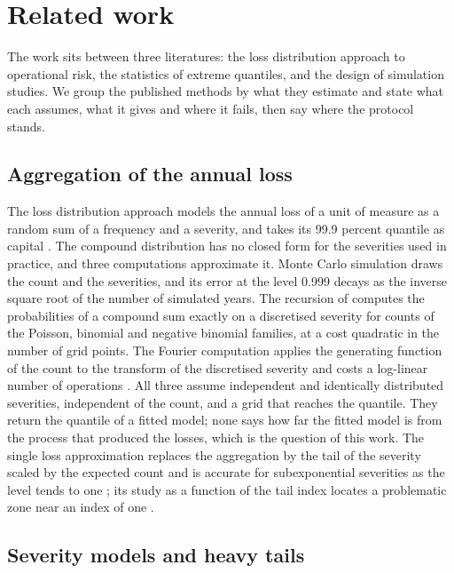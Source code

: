 \section{Related work}
\label{sec:related-work}

The work sits between three literatures: the loss distribution approach to operational risk, the statistics of extreme quantiles, and the design of simulation studies.
We group the published methods by what they estimate and state what each assumes, what it gives and where it fails, then say where the protocol stands.

\subsection{Aggregation of the annual loss}
\label{sec:rw-aggregation}

The loss distribution approach models the annual loss of a unit of measure as a random sum of a frequency and a severity, and takes its 99.9 percent quantile as capital \citep{shevchenko2010,cruz2015}.
The compound distribution has no closed form for the severities used in practice, and three computations approximate it. Monte Carlo simulation draws the count and the severities, and its
error at the level 0.999 decays as the inverse square root of the number of simulated years. The recursion of \citet{panjer1981} computes the probabilities of a compound sum exactly on a discretised
severity for counts of the Poisson, binomial and negative binomial families, at a cost quadratic in the number of grid points. The Fourier computation applies the generating function of the count to the transform of
the discretised severity and costs a log-linear number of operations \citep{shevchenko2010}. All three assume independent and identically distributed severities, independent of the count, and a grid that reaches the quantile.
They return the quantile of a fitted model; none says how far the fitted model is from the process that produced the losses, which is the question of this work. The single loss approximation
replaces the aggregation by the tail of the severity scaled by the expected count and is accurate for subexponential severities as the level tends to one \citep{embrechts1997,degen2010}; its study as a function of the tail index
locates a problematic zone near an index of one \citep{degen2010}.

\subsection{Severity models and heavy tails}
\label{sec:rw-severity}

